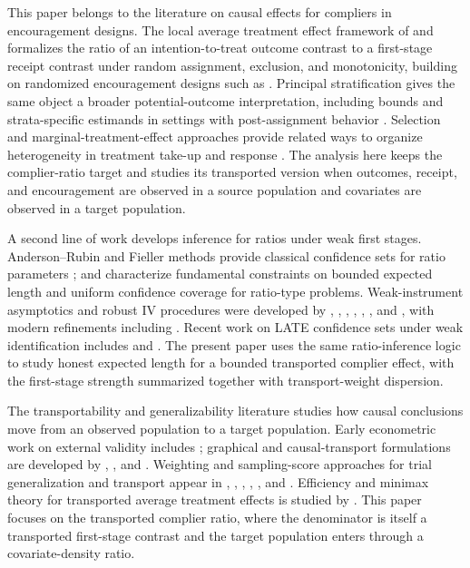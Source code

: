 This paper belongs to the literature on causal effects for compliers in encouragement designs. The local average treatment effect framework of \citet{ImbensAngrist1994} and \citet{AngristImbensRubin1996} formalizes the ratio of an intention-to-treat outcome contrast to a first-stage receipt contrast under random assignment, exclusion, and monotonicity, building on randomized encouragement designs such as \citet{Bloom1984}. Principal stratification gives the same object a broader potential-outcome interpretation, including bounds and strata-specific estimands in settings with post-assignment behavior \citep{BalkePearl1997,ImbensRubin1997,FrangakisRubin2002}. Selection and marginal-treatment-effect approaches provide related ways to organize heterogeneity in treatment take-up and response \citep{HeckmanVytlacil2005}. The analysis here keeps the complier-ratio target and studies its transported version when outcomes, receipt, and encouragement are observed in a source population and covariates are observed in a target population.

A second line of work develops inference for ratios under weak first stages. Anderson--Rubin and Fieller methods provide classical confidence sets for ratio parameters \citep{AndersonRubin1949,Fieller1954}; \citet{GleserHwang1987} and \citet{Dufour1997} characterize fundamental constraints on bounded expected length and uniform confidence coverage for ratio-type problems. Weak-instrument asymptotics and robust IV procedures were developed by \citet{BoundJaegerBaker1995}, \citet{StaigerStock1997}, \citet{StockWrightYogo2002}, \citet{Moreira2003}, \citet{AndrewsMoreiraStock2006}, \citet{Mikusheva2010}, and \citet{AndrewsStockSun2019}, with modern refinements including \citet{BertanhaMoreira2020}. Recent work on LATE confidence sets under weak identification includes \citet{Ma2023} and \citet{SmuclerLanniMasip2025}. The present paper uses the same ratio-inference logic to study honest expected length for a bounded transported complier effect, with the first-stage strength summarized together with transport-weight dispersion.

The transportability and generalizability literature studies how causal conclusions move from an observed population to a target population. Early econometric work on external validity includes \citet{HotzImbensMortimer2005}; graphical and causal-transport formulations are developed by \citet{PearlBareinboim2011}, \citet{BareinboimPearl2013}, and \citet{BareinboimPearl2016}. Weighting and sampling-score approaches for trial generalization and transport appear in \citet{ColeStuart2010}, \citet{StuartColeBradshawLeaf2011}, \citet{Tipton2013}, \citet{Dahabreh2020}, \citet{DahabrehPetitoRobertson2020}, and \citet{Nguyen2017}. Efficiency and minimax theory for transported average treatment effects is studied by \citet{ZengKennedyBodnarNaimi2024}. This paper focuses on the transported complier ratio, where the denominator is itself a transported first-stage contrast and the target population enters through a covariate-density ratio.

